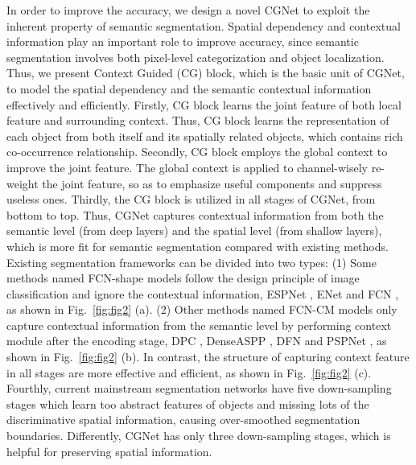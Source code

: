 \documentclass[10pt,twocolumn,letterpaper]{article}
\begin{document}
In order to improve the accuracy, we design a novel CGNet to exploit the inherent property of semantic segmentation.
Spatial dependency and contextual information play an important role to improve accuracy, since semantic segmentation involves both pixel-level categorization and object localization.
Thus, we present Context Guided (CG) block, which is the basic unit of CGNet, to model the spatial dependency and the semantic contextual information effectively and efficiently.
Firstly, CG block learns the joint feature of both local feature and surrounding context. Thus, CG block learns the representation of each object from both itself and its spatially related objects, which contains rich co-occurrence relationship.
Secondly, CG block employs the global context to improve the joint feature. The global context is applied to channel-wisely re-weight the joint feature, so as to emphasize useful components and suppress useless ones.
Thirdly, the CG block is utilized in all stages of CGNet, from bottom to top. Thus, CGNet captures contextual information from both the semantic level (from deep layers) and the spatial level (from shallow layers), which is more fit for semantic segmentation compared with existing methods. Existing segmentation frameworks can be divided into two types: (1) Some methods named FCN-shape models follow the design principle of image classification and ignore the contextual information, \eg ESPNet \cite{mehta2018espnet}, ENet \cite{yu2018bisenet} and FCN \cite{shelhamer2017fully}, as shown in Fig.~\ref{fig:fig2} (a). (2) Other methods named FCN-CM models only capture contextual information from the semantic level by performing context module after the encoding stage, \eg DPC \cite{chen2018searching}, DenseASPP \cite{yang2018denseaspp}, DFN \cite{Yu_2018_CVPR} and PSPNet \cite{Zhao_2017_CVPR}, as shown in Fig.~\ref{fig:fig2} (b). In contrast, the structure of capturing context feature in all stages are more effective and efficient, as shown in Fig.~\ref{fig:fig2} (c). Fourthly, current mainstream segmentation networks have five down-sampling stages which learn too abstract features of objects and missing lots of the discriminative spatial information, causing over-smoothed segmentation boundaries. Differently, CGNet has only three down-sampling stages, which is helpful for preserving spatial information.
\end{document}
